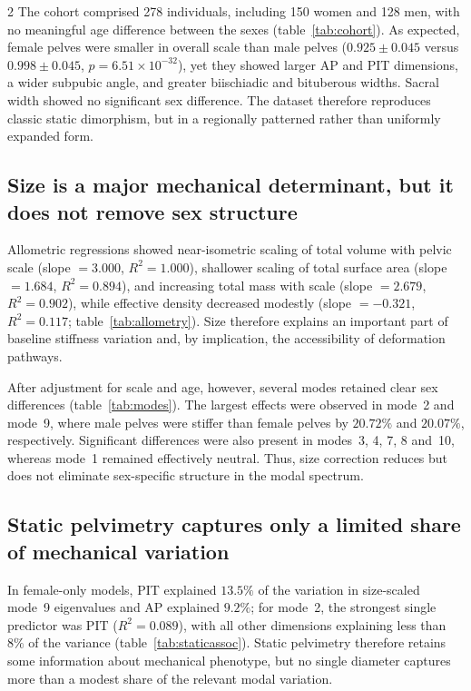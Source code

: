 \documentclass[openacc]{rsproca_new}
\begin{document}
\begin{multicols}{2}
The cohort comprised 278 individuals, including 150 women and 128 men, with no meaningful age difference between the sexes (table~\ref{tab:cohort}). As expected, female pelves were smaller in overall scale than male pelves ($0.925 \pm 0.045$ versus $0.998 \pm 0.045$, $p=6.51 \times 10^{-32}$), yet they showed larger AP and PIT dimensions, a wider subpubic angle, and greater biischiadic and bituberous widths. Sacral width showed no significant sex difference. The dataset therefore reproduces classic static dimorphism, but in a regionally patterned rather than uniformly expanded form.

\subsection{Size is a major mechanical determinant, but it does not remove sex structure}

Allometric regressions showed near-isometric scaling of total volume with pelvic scale (slope $=3.000$, $R^2=1.000$), shallower scaling of total surface area (slope $=1.684$, $R^2=0.894$), and increasing total mass with scale (slope $=2.679$, $R^2=0.902$), while effective density decreased modestly (slope $=-0.321$, $R^2=0.117$; table~\ref{tab:allometry}). Size therefore explains an important part of baseline stiffness variation and, by implication, the accessibility of deformation pathways.

After adjustment for scale and age, however, several modes retained clear sex differences (table~\ref{tab:modes}). The largest effects were observed in mode~2 and mode~9, where male pelves were stiffer than female pelves by $20.72\%$ and $20.07\%$, respectively. Significant differences were also present in modes~3, 4, 7, 8 and~10, whereas mode~1 remained effectively neutral. Thus, size correction reduces but does not eliminate sex-specific structure in the modal spectrum.

\subsection{Static pelvimetry captures only a limited share of mechanical variation}

In female-only models, PIT explained $13.5\%$ of the variation in size-scaled mode~9 eigenvalues and AP explained $9.2\%$; for mode~2, the strongest single predictor was PIT ($R^2=0.089$), with all other dimensions explaining less than $8\%$ of the variance (table~\ref{tab:staticassoc}). Static pelvimetry therefore retains some information about mechanical phenotype, but no single diameter captures more than a modest share of the relevant modal variation.


\end{multicols}
\end{document}
